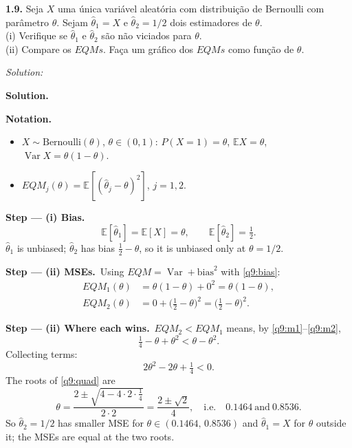 \documentclass[11pt,a4paper]{article}
\newif\ifsolucoes
\newcommand{\espacoresol}{4.5cm}   %
\numberwithin{equation}{questao}   %
\newenvironment{notacao}{\par\smallskip\noindent\textbf{Notation.}\begin{itemize}[leftmargin=1.4em,topsep=1pt,itemsep=0pt]\small}{\end{itemize}}
\newcommand{\resolespaco}{\ifsolucoes\else\par\textit{Solution:}\vspace{\espacoresol}\par\fi}
\newcommand{\passo}[2]{\par\smallskip\noindent\textbf{Step --- #1.}~#2}
\newcommand{\solhead}{\par\medskip\noindent{\color{blue!55!black}\rule{\linewidth}{0.3pt}}\par\noindent\textbf{Solution.}}
\newcommand{\E}{\mathbb{E}}
\newcommand{\Var}{\operatorname{Var}}
\begin{document}
\begin{otherlanguage}{brazil}
\textbf{1.9.} Seja $X$ uma única variável aleatória com distribuição de Bernoulli com parâmetro
$\theta$. Sejam $\hat\theta_1=X$ e $\hat\theta_2=1/2$ dois estimadores de $\theta$.\\
(i) Verifique se $\hat\theta_1$ e $\hat\theta_2$ são não viciados para $\theta$.\\
(ii) Compare os $EQMs$. Faça um gráfico dos $EQMs$ como função de $\theta$.
\end{otherlanguage}
\resolespaco
\begin{sol}
\solhead
\begin{notacao}
\item $X\sim\text{Bernoulli}(\theta)$, $\theta\in(0,1)$: $P(X=1)=\theta$, $\E X=\theta$, $\Var X=\theta(1-\theta)$.
\item $EQM_j(\theta)=\E[(\hat\theta_j-\theta)^2]$, $j=1,2$.
\end{notacao}

\passo{(i) Bias}{}
\begin{equation}\label{q9:bias}
\E[\hat\theta_1]=\E[X]=\theta,\qquad \E[\hat\theta_2]=\tfrac12 .
\end{equation}
$\hat\theta_1$ is unbiased; $\hat\theta_2$ has bias $\tfrac12-\theta$, so it is unbiased only at $\theta=1/2$.

\passo{(ii) MSEs}{Using $EQM=\Var+\text{bias}^2$ with \eqref{q9:bias}:}
\begin{align}
EQM_1(\theta)&=\theta(1-\theta)+0^2=\theta(1-\theta), \label{q9:m1}\\
EQM_2(\theta)&=0+\big(\tfrac12-\theta\big)^2=\big(\tfrac12-\theta\big)^2. \label{q9:m2}
\end{align}

\passo{(ii) Where each wins}{$EQM_2<EQM_1$ means, by \eqref{q9:m1}--\eqref{q9:m2},}
\[
\tfrac14-\theta+\theta^2<\theta-\theta^2 .
\]
Collecting terms:
\begin{equation}\label{q9:quad}
2\theta^2-2\theta+\tfrac14<0 .
\end{equation}
The roots of \eqref{q9:quad} are
\[
\theta=\frac{2\pm\sqrt{4-4\cdot2\cdot\frac14}}{2\cdot2}=\frac{2\pm\sqrt2}{4},
\quad\text{i.e.}\quad 0.1464\ \text{and}\ 0.8536 .
\]
So $\hat\theta_2=1/2$ has smaller MSE for $\theta\in(0.1464,\,0.8536)$ and $\hat\theta_1=X$ for
$\theta$ outside it; the MSEs are equal at the two roots.
\begin{center}
\end{center}


\end{sol}
\end{document}

